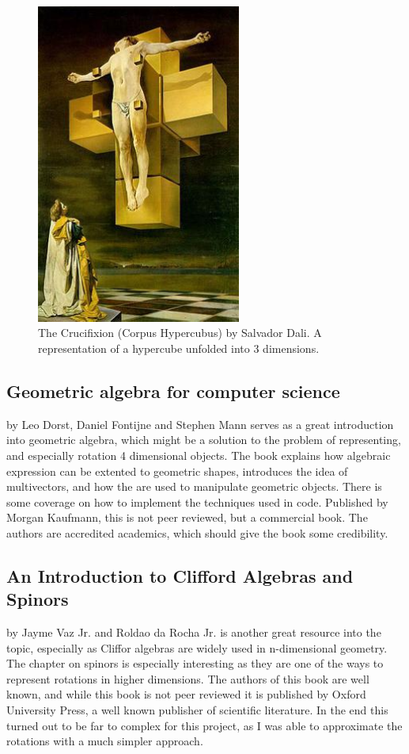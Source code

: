 \documentclass{article}
\begin{document}
\begin{figure}
    \label{fig:4d}
    \includegraphics[width=0.6\textwidth]{Dali_Crucifixion_hypercube.jpg}
    \caption{The Crucifixion (Corpus Hypercubus) by Salvador Dali. A representation of a hypercube unfolded into 3 dimensions.}
\end{figure}

\subsection{Geometric algebra for computer science} by Leo Dorst, Daniel Fontijne and Stephen Mann \cite{geo_alg} serves as a great introduction into geometric algebra, which might be a solution to the problem of representing, and especially rotation 4 dimensional objects. The book explains how algebraic expression can be extented to geometric shapes, introduces the idea of multivectors, and how the are used to manipulate geometric objects. There is some coverage on how to implement the techniques used in code. Published by Morgan Kaufmann, this is not peer reviewed, but a commercial book. The authors are accredited academics, which should give the book some credibility.
\subsection{An Introduction to Clifford Algebras and Spinors} by Jayme Vaz Jr. and Roldao da Rocha Jr. \cite{cliff_alg} is another great resource into the topic, especially as Cliffor algebras are widely used in n-dimensional geometry. The chapter on spinors is especially interesting as they are one of the ways to represent rotations in higher dimensions.
The authors of this book are well known, and while this book is not peer reviewed it is published by Oxford University Press, a well known publisher of scientific literature.
In the end this turned out to be far to complex for this project, as I was able to approximate the rotations with a much simpler approach.
\end{document}
